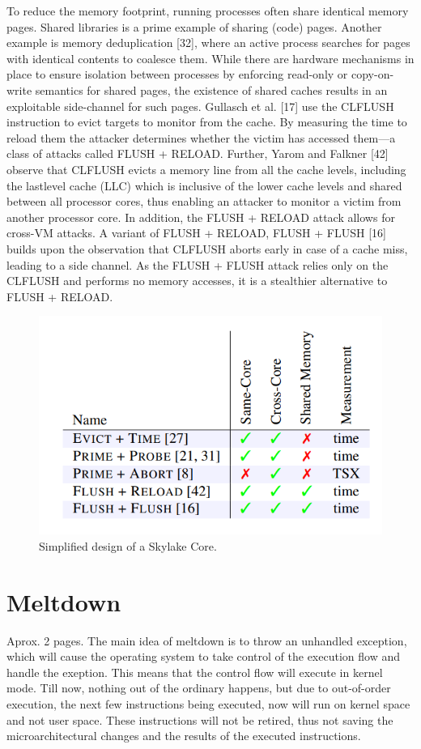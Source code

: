 \documentclass[sigconf]{acmart}
\begin{document}
To reduce the memory footprint, running processes often share identical memory pages. Shared libraries is a prime example of sharing (code) pages. Another example is memory deduplication [32], where an active process searches for pages with identical contents to coalesce them. While there are hardware mechanisms in place to ensure isolation between processes by enforcing read-only or copy-on-write semantics for shared pages, the existence of shared caches results in an exploitable side-channel for such pages. Gullasch et al. [17] use the CLFLUSH instruction to evict targets to monitor from the cache. By measuring the time to reload them the attacker determines whether the victim has accessed them—a class of attacks called FLUSH + RELOAD. Further, Yarom and Falkner [42] observe that CLFLUSH evicts a memory line from all the cache levels, including the lastlevel cache (LLC) which is inclusive of the lower cache levels and shared between all processor cores, thus enabling an attacker to monitor a victim from another processor core. In addition, the FLUSH + RELOAD attack allows for cross-VM attacks.
A variant of FLUSH + RELOAD, FLUSH + FLUSH [16] builds upon the observation that CLFLUSH aborts early in case of a cache miss, leading to a side channel. As the FLUSH + FLUSH attack relies only on the CLFLUSH and performs no memory accesses, it is a stealthier alternative to FLUSH + RELOAD.

\begin{figure}[h]
  \centering
  \includegraphics[width=\linewidth]{side-channel}
  \caption{Simplified design of a Skylake Core.}  
\end{figure}

\section{Meltdown}
Aprox. 2 pages.
The main idea of meltdown is to throw an unhandled exception, which will cause the operating system to take control of the execution flow and handle the exeption. This means that the control flow will execute in kernel mode. Till now, nothing out of the ordinary happens, but due to out-of-order execution, the next few instructions being executed, now will run on kernel space and not user space. These instructions will not be retired, thus not saving the microarchitectural changes and the results of the executed instructions.
\end{document}
